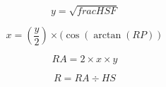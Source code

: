 \documentclass{article}
\begin{document}
\[ y = \sqrt{frac{HS}{F}} \]
\pagebreak

\[ x = (\frac{y}{2}) \times (\cos (\arctan (RP)) \]
\pagebreak

\[ RA = 2 \times x \times y \]
\pagebreak

\[ R = RA \div HS \]
\pagebreak
\end{document}
